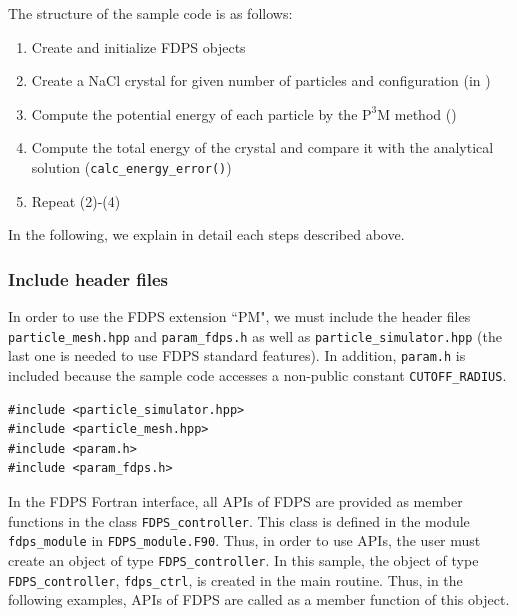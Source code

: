The structure of the sample code is as follows:
\begin{enumerate}[leftmargin=*,itemsep=-1ex,label={(\arabic*)}]
\item Create and initialize FDPS objects
\item Create a NaCl crystal for given number of particles and configuration (in \procedure {})
\item Compute the potential energy of each particle by the $\mathrm{P^{3}M}$ method ()
\item Compute the total energy of the crystal and compare it with the analytical solution (\procedure \texttt{calc\_energy\_error()})
\item Repeat (2)-(4)
\end{enumerate}

In the following, we explain in detail each steps described above.

\ifCpp
\subsubsection{Include header files}
In order to use the FDPS extension ``\textsf{PM}", we must include the header files \texttt{particle\_mesh.hpp} and \texttt{param\_fdps.h} as well as \texttt{particle\_simulator.hpp} (the last one is needed to use FDPS standard features). In addition, \texttt{param.h} is included because the sample code accesses a non-public constant \texttt{CUTOFF\_RADIUS}.
\begin{lstlisting}[caption=Include FDPS's header files]
#include <particle_simulator.hpp>
#include <particle_mesh.hpp>
#include <param.h>
#include <param_fdps.h>
\end{lstlisting}
\endifCpp
\ifFtn
{}
In the FDPS Fortran interface, all APIs of FDPS are provided as member functions in the class \texttt{FDPS\_controller}. This class is defined in the module \texttt{fdps\_module} in \texttt{FDPS\_module.F90}. Thus, in order to use APIs, the user must create an object of type \texttt{FDPS\_controller}. In this sample, the object of type \texttt{FDPS\_controller},  \texttt{fdps\_ctrl}, is created in the main routine. Thus, in the following examples, APIs of FDPS are called as a member function of this object.

